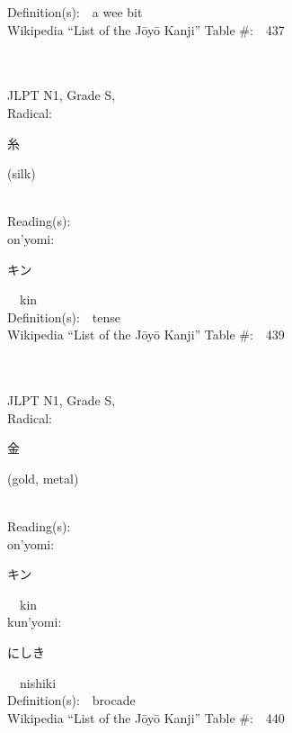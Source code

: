\begin{multicols}{2}
Definition(s):\ \ a wee bit \\
Wikipedia ``List of the J\=oy\=o Kanji'' Table \#:\ \ 437 \\
\ \ \\
{\fontsize{34pt}{40pt}  }\ \ \\
{JLPT N1, Grade S, \\Radical:\ \ {\begin{CJK}{UTF8}{min} 糸 \end{CJK}} (silk) } \\
Reading(s):\ \ \\
{\hspace*{1em}}on'yomi:\ \ \\
{\hspace*{2em}}{\begin{CJK}{UTF8}{min} キン \end{CJK}}\ \ kin\ \ \\
Definition(s):\ \ tense \\
Wikipedia ``List of the J\=oy\=o Kanji'' Table \#:\ \ 439 \\
\ \ \\
{\fontsize{34pt}{40pt}  }\ \ \\
{JLPT N1, Grade S, \\Radical:\ \ {\begin{CJK}{UTF8}{min} 金 \end{CJK}} (gold, metal) } \\
Reading(s):\ \ \\
{\hspace*{1em}}on'yomi:\ \ \\
{\hspace*{2em}}{\begin{CJK}{UTF8}{min} キン \end{CJK}}\ \ kin\ \ \\
{\hspace*{1em}}kun'yomi:\ \ \\
{\hspace*{2em}}{\begin{CJK}{UTF8}{min} にしき \end{CJK}}\ \ nishiki\ \ \\
Definition(s):\ \ brocade \\
Wikipedia ``List of the J\=oy\=o Kanji'' Table \#:\ \ 440 \\

\end{multicols}
